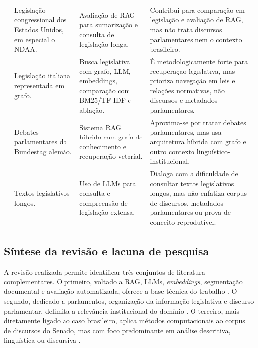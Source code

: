 \begin{scriptsize}
\begin{longtable}{@{}p{}p{}p{}p{}@{}}
\textcite{garrisonEtAl2024talkNdaa} & Legislação congressional dos Estados Unidos, em especial o NDAA. & Avaliação de RAG para sumarização e consulta de legislação longa. & Contribui para comparação em legislação e avaliação de RAG, mas não trata discursos parlamentares nem o contexto brasileiro. \\
\textcite{colomboEtAl2025legisSearch} & Legislação italiana representada em grafo. & Busca legislativa com grafo, LLM, embeddings, comparação com BM25/TF-IDF e ablação. & É metodologicamente forte para recuperação legislativa, mas prioriza navegação em leis e relações normativas, não discursos e metadados parlamentares. \\
\textcite{mosbachEtAl2025worldAvatarParliament} & Debates parlamentares do Bundestag alemão. & Sistema RAG híbrido com grafo de conhecimento e recuperação vetorial. & Aproxima-se por tratar debates parlamentares, mas usa arquitetura híbrida com grafo e outro contexto linguístico-institucional. \\
\textcite{sarnikar2025legislativeTexts} & Textos legislativos longos. & Uso de LLMs para consulta e compreensão de legislação extensa. & Dialoga com a dificuldade de consultar textos legislativos longos, mas não enfatiza corpus de discursos, metadados parlamentares ou prova de conceito reprodutível. \\
\hline
\end{longtable}
\end{scriptsize}

\subsection{Síntese da revisão e lacuna de pesquisa}

A revisão realizada permite identificar três conjuntos de literatura complementares. O primeiro, voltado a RAG, LLMs, \textit{embeddings}, segmentação documental e avaliação automatizada, oferece a base técnica do trabalho \parencite{lewisEtAl2020rag,gao2023ragSurvey,minaee2024llmSurvey,nie2024textEmbeddingSurvey,saadFalconEtAl2024ares}. O segundo, dedicado a parlamentos, organização da informação legislativa e discurso parlamentar, delimita a relevância institucional do domínio \parencite{skubicFiser2024discourseReview,martelloteViola2025organizacaoConhecimento,ipu2024aiParliaments}. O terceiro, mais diretamente ligado ao caso brasileiro, aplica métodos computacionais ao corpus de discursos do Senado, mas com foco predominante em análise descritiva, linguística ou discursiva \parencite{blanco2025plenarioPalanqueEstudio,blanco2026letrasGraudas}. 

